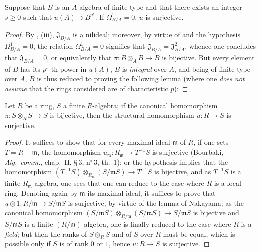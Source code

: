 \begin{corollary}[21.1.6]
\label{0.21.1.6}
Suppose that $B$ is an $A$-algebra of finite type and that there exists an integer $s\geq 0$ such that $u(A)\supset B^{p^s}$.
If $\Omega^1_{B/A}=0$, $u$ is surjective.
\end{corollary}

\begin{proof}
By , (iii), $\mathfrak{J}_{B/A}$ is a nilideal; moreover, by virtue of  and the hypothesis $\Omega^1_{B/A}=0$, the relation $\Omega^1_{B/A}=0$ signifies that $\mathfrak{J}_{B/A}=\mathfrak{J}^2_{B/A}$, whence one concludes that $\mathfrak{J}_{B/A}=0$, or equivalently that $\pi:B\otimes_A B\to B$ is bijective.
But every element of $B$ has its $p^s$-th power in $u(A)$, $B$ is \emph{integral} over $A$, and being of finite type over $A$, $B$ is thus reduced to proving the following lemma (where one \emph{does not assume} that the rings considered are of characteristic $p$):
\end{proof}

\begin{lemma}[21.1.6.1]
\label{0.21.1.6.1}
Let $R$ be a ring, $S$ a finite $R$-algebra; if the canonical homomorphism $\pi:S\otimes_R S\to S$ is bijective, then the structural homomorphism $u:R\to S$ is surjective.
\end{lemma}

\begin{proof}
It suffices to show that for every maximal ideal $\mathfrak{m}$ of $R$, if one sets $T=R-\mathfrak{m}$, the homomorphism $u_\mathfrak{m}:R_\mathfrak{m}\to T^{-1}S$ is surjective (Bourbaki, \emph{Alg.\ comm.}, chap.~II, \S\,3, n$^\circ$\,3, th.~1); or the hypothesis implies that the homomorphism $(T^{-1}S)\otimes_{R_\mathfrak{m}}(S/\mathfrak{m}S)\to T^{-1}S$ is bijective, and as $T^{-1}S$ is a finite $R_\mathfrak{m}$-algebra, one sees that one can reduce to the case where $R$ is a local ring.
Denoting again by $\mathfrak{m}$ its maximal ideal, it suffices to prove that $u\otimes 1:R/\mathfrak{m}\to S/\mathfrak{m}S$ is surjective, by virtue of the lemma of Nakayama; as the canonical homomorphism $(S/\mathfrak{m}S)\otimes_{R/\mathfrak{m}}(S/\mathfrak{m}S)\to S/\mathfrak{m}S$ is bijective and $S/\mathfrak{m}S$ is a finite $(R/\mathfrak{m})$-algebra, one is finally reduced to the case where $R$ is a \emph{field}; but then the ranks of $S\otimes_R S$ and of $S$ over $R$ must be equal, which is possible only if $S$ is of rank $0$ or $1$, hence $u:R\to S$ is surjective.
\end{proof}

